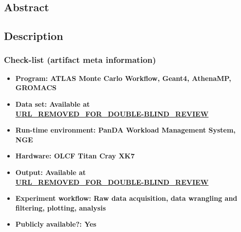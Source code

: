 \subsection{Abstract}




\subsection{Description}

\subsubsection{Check-list (artifact meta information)}

{\small
\begin{itemize}
  \item {\bf Program: ATLAS Monte Carlo Workflow, Geant4, AthenaMP, GROMACS}
  \item {\bf Data set: Available at \\
  \url{URL_REMOVED_FOR_DOUBLE-BLIND_REVIEW}}
  \item {\bf Run-time environment: PanDA Workload Management System, NGE}
  \item {\bf Hardware: OLCF Titan Cray XK7}
  \item {\bf Output: Available at \\
  \url{URL_REMOVED_FOR_DOUBLE-BLIND_REVIEW}}
  \item {\bf Experiment workflow: Raw data acquisition, data wrangling and filtering, plotting, analysis}
  \item {\bf Publicly available?: Yes}
\end{itemize}
}


